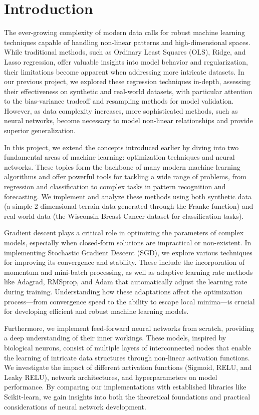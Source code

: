 \documentclass[aps,pra,english,notitlepage,reprint,nofootinbib]{revtex4-1}  %
\begin{document}
\section{Introduction}\label{sec:introduction}

The ever-growing complexity of modern data calls for robust machine learning techniques capable of handling non-linear patterns and high-dimensional spaces. While traditional methods, such as Ordinary Least Squares (OLS), Ridge, and Lasso regression, offer valuable insights into model behavior and regularization, their limitations become apparent when addressing more intricate datasets. In our previous project, we explored these regression techniques in-depth, assessing their effectiveness on synthetic and real-world datasets, with particular attention to the bias-variance tradeoff and resampling methods for model validation. However, as data complexity increases, more sophisticated methods, such as neural networks, become necessary to model non-linear relationships and provide superior generalization.

In this project, we extend the concepts introduced earlier by diving into two fundamental areas of machine learning: optimization techniques and neural networks. These topics form the backbone of many modern machine learning algorithms and offer powerful tools for tackling a wide range of problems, from regression and classification to complex tasks in pattern recognition and forecasting. We implement and analyze these methods using both synthetic data (a simple 2 dimensional terrain data generated through the Franke function) and real-world data (the Wisconsin Breast Cancer dataset for classification tasks).

Gradient descent plays a critical role in optimizing the parameters of complex models, especially when closed-form solutions are impractical or non-existent. In implementing Stochastic Gradient Descent (SGD), we explore various techniques for improving its convergence and stability. These include the incorporation of momentum and mini-batch processing, as well as adaptive learning rate methods like Adagrad, RMSprop, and Adam that automatically adjust the learning rate during training. Understanding how these adaptations affect the optimization process—from convergence speed to the ability to escape local minima—is crucial for developing efficient and robust machine learning models.

Furthermore, we implement feed-forward neural networks from scratch, providing a deep understanding of their inner workings. These models, inspired by biological neurons, consist of multiple layers of interconnected nodes that enable the learning of intricate data structures through non-linear activation functions. We investigate the impact of different activation functions (Sigmoid, RELU, and Leaky RELU), network architectures, and hyperparameters on model performance. By comparing our implementations with established libraries like Scikit-learn, we gain insights into both the theoretical foundations and practical considerations of neural network development.
\end{document}
